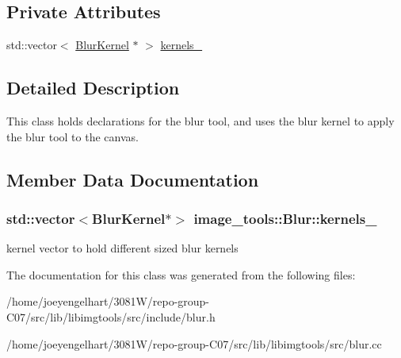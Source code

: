 \subsection*{Private Attributes}
\begin{DoxyCompactItemize}
\item 
std\+::vector$<$ \hyperlink{classimage__tools_1_1BlurKernel}{Blur\+Kernel} $\ast$ $>$ \hyperlink{classimage__tools_1_1Blur_a6a7ce9d0769b2659752026dc41ddbb4c}{kernels\+\_\+}
\end{DoxyCompactItemize}


\subsection{Detailed Description}
This class holds declarations for the blur tool, and uses the blur kernel to apply the blur tool to the canvas. 

\subsection{Member Data Documentation}
\subsubsection[{\texorpdfstring{kernels\+\_\+}{kernels_}}]{\setlength{\rightskip}{0pt plus 5cm}std\+::vector$<${\bf Blur\+Kernel}$\ast$$>$ image\+\_\+tools\+::\+Blur\+::kernels\+\_\+\hspace{0.3cm}{\ttfamily [private]}}\hypertarget{classimage__tools_1_1Blur_a6a7ce9d0769b2659752026dc41ddbb4c}{}\label{classimage__tools_1_1Blur_a6a7ce9d0769b2659752026dc41ddbb4c}
kernel vector to hold different sized blur kernels 

The documentation for this class was generated from the following files\+:\begin{DoxyCompactItemize}
\item 
/home/joeyengelhart/3081\+W/repo-\/group-\/\+C07/src/lib/libimgtools/src/include/blur.\+h\item 
/home/joeyengelhart/3081\+W/repo-\/group-\/\+C07/src/lib/libimgtools/src/blur.\+cc\end{DoxyCompactItemize}
